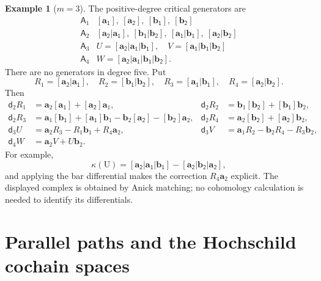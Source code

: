 \documentclass[a4paper,11pt,oneside,reqno]{amsart}
\theoremstyle{definition}
\newtheorem{example}[theorem]{Example}
\numberwithin{equation}{section}
\begin{document}
	
\begin{example}[$m=3$]\label{ex:m3}
		The positive-degree critical generators are
		\[
		\begin{array}{c|l}
			\mathsf A_1&\mathsf{[\mathbf{a}_1]},\ \mathsf{[\mathbf{a}_2]},\ \mathsf{[\mathbf{b}_1]},\ \mathsf{[\mathbf{b}_2]}\\
			\mathsf A_2&\mathsf{[\mathbf{a}_2|\mathbf{a}_1]},\ \mathsf{[\mathbf{b}_1|\mathbf{b}_2]},\ \mathsf{[\mathbf{a}_1|\mathbf{b}_1]},\ \mathsf{[\mathbf{a}_2|\mathbf{b}_2]}\\
			\mathsf A_3&U=\mathsf{[\mathbf{a}_2|\mathbf{a}_1|\mathbf{b}_1]},\quad V=\mathsf{[\mathbf{a}_1|\mathbf{b}_1|\mathbf{b}_2]}\\
			\mathsf A_4&W=\mathsf{[\mathbf{a}_2|\mathbf{a}_1|\mathbf{b}_1|\mathbf{b}_2]}.
		\end{array}
		\]
		There are no generators in degree five.  Put
		\[
		R_1=\mathsf{[\mathbf{a}_2|\mathbf{a}_1]},\quad R_2=\mathsf{[\mathbf{b}_1|\mathbf{b}_2]},\quad
		R_3=\mathsf{[\mathbf{a}_1|\mathbf{b}_1]},\quad R_4=\mathsf{[\mathbf{a}_2|\mathbf{b}_2]}.
		\]
		Then
		\begin{align*}
			\mathsf d_2R_1&=\mathbf{a}_2\mathsf{[\mathbf{a}_1]}+\mathsf{[\mathbf{a}_2]}\mathbf{a}_1,&
			\mathsf d_2R_2&=\mathbf{b}_1\mathsf{[\mathbf{b}_2]}+\mathsf{[\mathbf{b}_1]}\mathbf{b}_2,\\
			\mathsf d_2R_3&=\mathbf{a}_1\mathsf{[\mathbf{b}_1]}+\mathsf{[\mathbf{a}_1]}\mathbf{b}_1-\mathbf{b}_2\mathsf{[\mathbf{a}_2]}-\mathsf{[\mathbf{b}_2]}\mathbf{a}_2,&
			\mathsf d_2R_4&=\mathbf{a}_2\mathsf{[\mathbf{b}_2]}+\mathsf{[\mathbf{a}_2]}\mathbf{b}_2,\\
			\mathsf d_3U&=\mathbf{a}_2R_3-R_1\mathbf{b}_1+R_4\mathbf{a}_2,&
			\mathsf d_3V&=\mathbf{a}_1R_2-\mathbf{b}_2R_4-R_3\mathbf{b}_2,\\
			\mathsf d_4W&=\mathbf{a}_2V+U\mathbf{b}_2.
		\end{align*}
		For example,
		\[
		\kappa(\mathrm U)=\mathsf{[\mathbf{a}_2|\mathbf{a}_1|\mathbf{b}_1]}-\mathsf{[\mathbf{a}_2|\mathbf{b}_2|\mathbf{a}_2]},
		\]
		and applying the bar differential makes the correction $R_4\mathbf{a}_2$ explicit.
		The displayed complex is obtained by Anick matching; no cohomology
		calculation is needed to identify its differentials.
	\end{example}
	
	\section{Parallel paths and the Hochschild cochain spaces}
	\label{sec:cochains}
	
\end{document}
